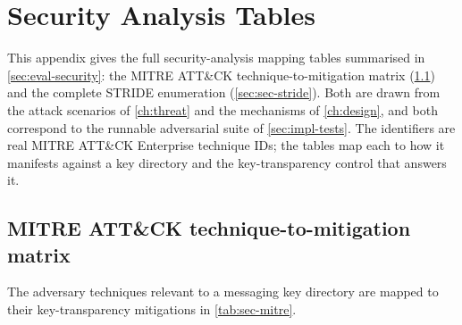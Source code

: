 \chapter{Security Analysis Tables}\label{app:security}

This appendix gives the full security-analysis mapping tables summarised in
\cref{sec:eval-security}: the MITRE ATT\&CK technique-to-mitigation matrix
(\cref{sec:sec-mitre}) and the complete STRIDE enumeration (\cref{sec:sec-stride}). Both are drawn
from the attack scenarios of \cref{ch:threat} and the mechanisms of \cref{ch:design}, and both
correspond to the runnable adversarial suite of \cref{sec:impl-tests}. The identifiers are real
MITRE ATT\&CK Enterprise technique IDs; the tables map each to how it manifests against a key
directory and the key-transparency control that answers it.

\section{MITRE ATT\&CK technique-to-mitigation matrix}\label{sec:sec-mitre}

The adversary techniques relevant to a messaging key directory are mapped to their
key-transparency mitigations in \cref{tab:sec-mitre}.

